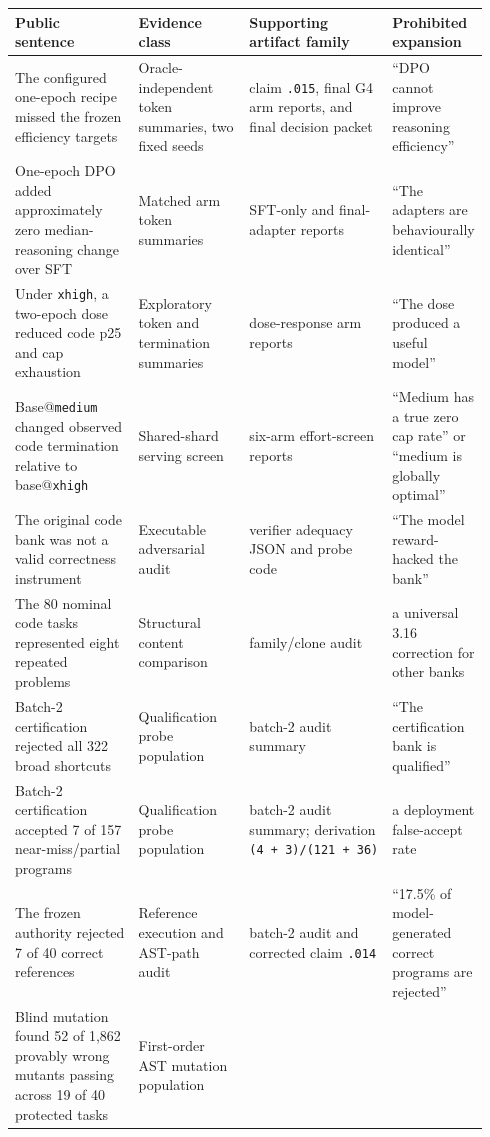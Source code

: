 \documentclass[
  9pt,
  letterpaper,
]{article}
\begin{document}
\begin{longtable}[]{@{}p{0.28\linewidth}p{0.25\linewidth}p{0.21\linewidth}p{0.20\linewidth}@{}}
\toprule\noalign{}
Public sentence & Evidence class & Supporting artifact family &
Prohibited expansion \\
\midrule\noalign{}
\endhead
\bottomrule\noalign{}
\endlastfoot
The configured one-epoch recipe missed the frozen efficiency targets &
Oracle-independent token summaries, two fixed seeds & claim
\texttt{.015}, final G4 arm reports, and final decision packet & ``DPO
cannot improve reasoning efficiency'' \\
One-epoch DPO added approximately zero median-reasoning change over SFT
& Matched arm token summaries & SFT-only and final-adapter reports &
``The adapters are behaviourally identical'' \\
Under \texttt{xhigh}, a two-epoch dose reduced code p25 and cap
exhaustion & Exploratory token and termination summaries & dose-response
arm reports & ``The dose produced a useful model'' \\
Base@\texttt{medium} changed observed code termination relative to
base@\texttt{xhigh} & Shared-shard serving screen & six-arm
effort-screen reports & ``Medium has a true zero cap rate'' or ``medium
is globally optimal'' \\
The original code bank was not a valid correctness instrument &
Executable adversarial audit & verifier adequacy JSON and probe code &
``The model reward-hacked the bank'' \\
The 80 nominal code tasks represented eight repeated problems &
Structural content comparison & family/clone audit & a universal 3.16
correction for other banks \\
Batch-2 certification rejected all 322 broad shortcuts & Qualification
probe population & batch-2 audit summary & ``The certification bank is
qualified'' \\
Batch-2 certification accepted 7 of 157 near-miss/partial programs &
Qualification probe population & batch-2 audit summary; derivation
\texttt{(4\ +\ 3)/(121\ +\ 36)} & a deployment false-accept rate \\
The frozen authority rejected 7 of 40 correct references & Reference
execution and AST-path audit & batch-2 audit and corrected claim
\texttt{.014} & ``17.5\% of model-generated correct programs are
rejected'' \\
Blind mutation found 52 of 1,862 provably wrong mutants passing across
19 of 40 protected tasks & First-order AST mutation population &

\end{longtable}
\end{document}
